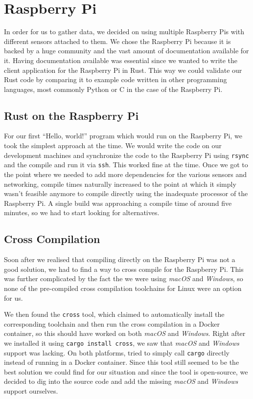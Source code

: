 \section{Raspberry Pi}

In order for us to gather data, we decided on using multiple Raspberry Pis with different sensors
attached to them. We chose the Raspberry Pi because it is backed by a huge community and the vast
amount of documentation available for it. Having documentation available was essential since we
wanted to write the client application for the Raspberry Pi in Rust. This way we could validate our
Rust code by comparing it to example code written in other programming languages, most commonly
Python or C in the case of the Raspberry Pi.

\subsection{Rust on the Raspberry Pi}

For our first “Hello, world!” program which would run on the Raspberry Pi, we took the simplest
approach at the time. We would write the code on our development machines and synchronize the code
to the Raspberry Pi using \texttt{rsync} and the compile and run it via \texttt{ssh}. This worked
fine at the time. Once we got to the point where we needed to add more dependencies for the various
sensors and networking, compile times naturally increased to the point at which it simply wasn't
feasible anymore to compile directly using the inadequate processor of the Raspberry Pi. A single
build was approaching a compile time of around five minutes, so we had to start looking for
alternatives.

\subsection{Cross Compilation}

Soon after we realised that compiling directly on the Raspberry Pi was not a good solution, we had
to find a way to cross compile for the Raspberry Pi. This was further complicated by the fact the we
were using \textit{macOS} and \textit{Windows}, so none of the pre-compiled cross compilation
toolchains for Linux were an option for us.

We then found the \texttt{cross} tool, which claimed to automatically install the corresponding
toolchain and then run the cross compilation in a Docker container, so this should have worked on
both \textit{macOS} and \textit{Windows}. Right after we installed it using \texttt{cargo install
cross}, we saw that \textit{macOS} and \textit{Windows} support was lacking. On both platforms,
tried to simply call \texttt{cargo} directly instead of running in a Docker container. Since this
tool still seemed to be the best solution we could find for our situation and since the tool is
open-source, we decided to dig into the source code and add the missing \textit{macOS} and
\textit{Windows} support ourselves.

